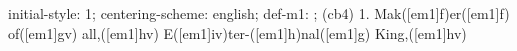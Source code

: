 initial-style: 1;
centering-scheme: english;
def-m1: \grealign;
(cb4) 1. Mak([em1]f)er([em1]f) of([em1]gv) all,([em1]hv) E([em1]iv)ter-([em1]h)nal([em1]g) King,([em1]hv)